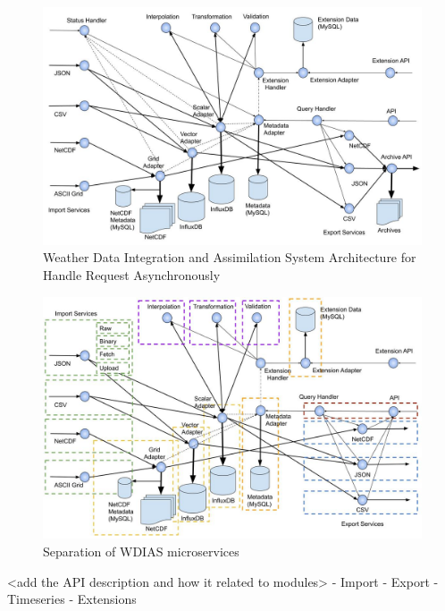 \begin{figure}[htp]
    \centering
    \includegraphics[width=1\textwidth]{method/microservice/microservice_architecture-handle_on_async-v3.jpg}
    \caption{Weather Data Integration and Assimilation System Architecture for Handle Request Asynchronously}
    \label{fi:wdias_micro_async}
\end{figure}

\begin{figure}[htp]
    \centering
    \includegraphics[width=1\textwidth]{method/microservice/separation_microservices-v3.jpg}
    \caption{Separation of WDIAS microservices}
    \label{fi:wdias_micro_separation}
\end{figure}

<add the API description and how it related to modules>
- Import
- Export
- Timeseries
- Extensions
